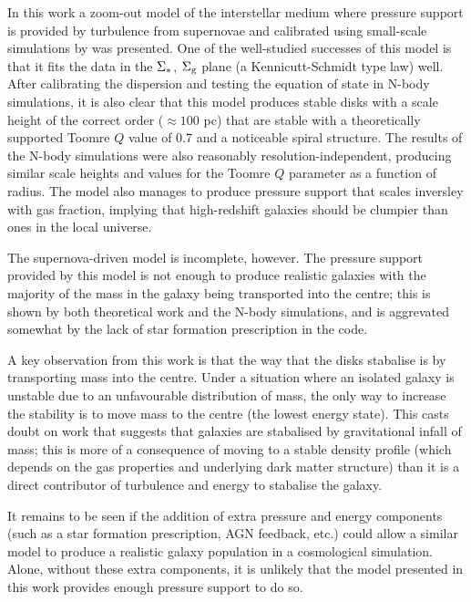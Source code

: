 In this work a zoom-out model of the interstellar medium where pressure support is provided by turbulence from supernovae and calibrated using small-scale simulations by \citet{martizzi_supernova_2015} was presented.
One of the well-studied successes of this model is that it fits the data in the $\Sigma_*$, $\Sigma_\mathrm{g}$ plane (a Kennicutt-Schmidt type law) well.
After calibrating the dispersion and testing the equation of state in N-body simulations, it is also clear that this model produces stable disks with a scale height of the correct order ($\approx 100$ pc) that are stable with a theoretically supported Toomre $Q$ value of 0.7 and a noticeable spiral structure.
The results of the N-body simulations were also reasonably resolution-independent, producing similar scale heights and values for the Toomre $Q$ parameter as a function of radius.
The model also manages to produce pressure support that scales inversley with gas fraction, implying that high-redshift galaxies should be clumpier than ones in the local universe.

The supernova-driven model is incomplete, however.
The pressure support provided by this model is not enough to produce realistic galaxies with the majority of the mass in the galaxy being transported into the centre; this is shown by both theoretical work and the N-body simulations, and is aggrevated somewhat by the lack of star formation prescription in the code.

A key observation from this work is that the way that the disks stabalise is by transporting mass into the centre.
Under a situation where an isolated galaxy is unstable due to an unfavourable distribution of mass, the only way to increase the stability is to move mass to the centre (the lowest energy state).
This casts doubt on work that suggests that galaxies are stabalised by gravitational infall of mass; this is more of a consequence of moving to a stable density profile (which depends on the gas properties and underlying dark matter structure) than it is a direct contributor of turbulence and energy to stabalise the galaxy.

It remains to be seen if the addition of extra pressure and energy components (such as a star formation prescription, AGN feedback, etc.) could allow a similar model to produce a realistic galaxy population in a cosmological simulation.
Alone, without these extra components, it is unlikely that the model presented in this work provides enough pressure support to do so.

